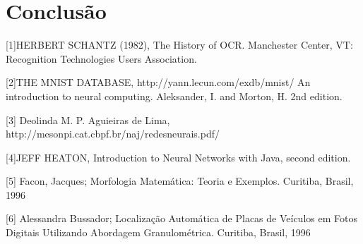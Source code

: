 \documentclass[
	article,			%
	11pt,				%
	oneside,			%
	a4paper,			%
	english,			%
	brazil,				%
	sumario=tradicional
	]{abntex2}
\begin{document}
\section{Conclusão}
\begin{thebibliography}{1}

[1]HERBERT SCHANTZ (1982), The History of OCR. Manchester Center, VT: Recognition Technologies Users Association.

[2]THE MNIST DATABASE, http://yann.lecun.com/exdb/mnist/ An introduction to neural computing. Aleksander, I. and Morton, H. 2nd edition.

[3] Deolinda M. P. Aguieiras de Lima, http://mesonpi.cat.cbpf.br/naj/redesneurais.pdf/

[4]JEFF HEATON, Introduction to Neural Networks with Java, second edition.

[5] Facon, Jacques; Morfologia Matemática: Teoria e Exemplos. Curitiba,
 Brasil, 1996

[6] Alessandra Bussador; Localização Automática de Placas de Veículos em Fotos
Digitais Utilizando Abordagem Granulométrica. Curitiba,
 Brasil, 1996
\end{thebibliography}
\end{document}
